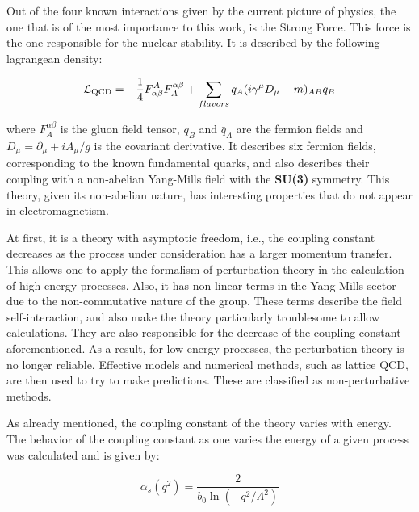 \mysection{\qcd}

Out of the four known interactions given by the current picture of physics, the one that is of the most importance to this work, is the Strong Force. This force is the one responsible for the nuclear stability. It is described by the following lagrangean density\citep{peskin_introduction_1995,halzen_quarks_1984}:

\begin{equation}
\mathcal{L}_{\rm QCD} = -\frac{1}{4}F^{A}_{\alpha\beta}F^{\alpha\beta}_{A}
+\sum_{flavors}
\bar{q}_{A}(i\gamma^{\mu}D_{\mu}-m)_{AB}
q_{B}
\end{equation}

where $F^{\alpha\beta}_{A}$ is the gluon field tensor, $q_{B}$ and $\bar{q}_{A}$ are the fermion fields and $D_{\mu}=\partial_{\mu} + i A_{\mu}/g$ is the covariant derivative. It describes six fermion fields, corresponding to the known fundamental quarks, and also describes their coupling with a non-abelian Yang-Mills field with the \textbf{SU(3)} symmetry. This theory, given its non-abelian nature, has interesting properties that do not appear in electromagnetism.
\par
At first, it is a theory with asymptotic freedom, i.e., the coupling constant decreases as the process under consideration has a larger momentum transfer. This allows one to apply the formalism of perturbation theory in the calculation of high energy processes. Also, it has non-linear terms in the Yang-Mills sector due to the non-commutative nature of the group. These terms describe the field self-interaction, and also make the theory particularly troublesome to allow calculations. They are also responsible for the decrease of the coupling constant aforementioned. As a result, for low energy processes, the perturbation theory is no longer reliable. Effective models and numerical methods, such as lattice QCD, are then used to try to make predictions. These are classified as non-perturbative methods.
\par
As already mentioned, the coupling constant of the theory varies with energy. The behavior of the coupling constant as one varies the energy of a given process was calculated and is given by\cite{dissertori_quantum_2003}:

\begin{equation}
\alpha_s (q^2) = \frac{2}{b_0 \ln (-q^2/\Lambda^2)}
\end{equation}

